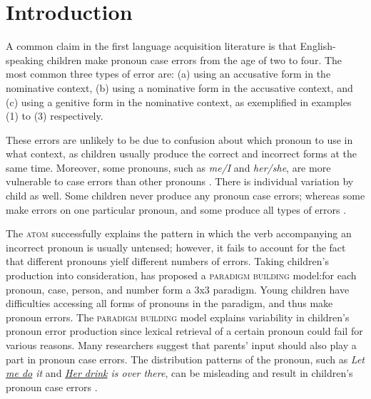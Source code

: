 \section{Introduction}
A common claim in the first language acquisition literature is that English-speaking children make pronoun case errors from the age of two to four. The most common three types of error are: (a) using an accusative form in the nominative context, (b) using a nominative form in the accusative context, and (c) using a genitive form in the nominative context, as exemplified in examples (1) to (3) respectively. 

\begin{exe}
\end{exe}

These errors are unlikely to be due to confusion about which pronoun to use in what context, as children usually produce the correct and incorrect forms at the same time. Moreover, some pronouns, such as \textit{me/I} and \textit{her/she}, are more vulnerable to case errors than other pronouns \citep[e.g.][]{schutze1996subject,rispoli1998,rispoli1999,pine2005testing}. There is individual variation by child as well. Some children never produce any pronoun case errors; whereas some make errors on one particular pronoun, and some produce all types of errors \citep{rispoli2005}.  




The \textsc{atom} successfully explains the pattern in which the verb accompanying an incorrect pronoun is usually untensed; however, it fails to account for the fact that different pronouns yielf different numbers of errors. Taking children's production into consideration,  \cite{rispoli1998,rispoli1999,rispoli2005} has proposed a  \textsc{paradigm building} model:for each pronoun, case, person, and number form a 3x3 paradigm. Young children have difficulties accessing all forms of pronouns in the paradigm, and thus make pronoun errors. The \textsc{paradigm building} model explains variability in children's pronoun error production since lexical retrieval of a certain pronoun could fail for various reasons. Many researchers suggest that parents' input should also play a part in pronoun case errors. The distribution patterns of the pronoun, such as \textit{Let \underline{me do} it} and \textit{\underline{Her drink} is over there}, can be misleading and result in children's pronoun case errors \citep[e.g.][]{budwig1996influences,tomasello2000,tomasello2003, ambridge2006testing,kirjavainen2009can}.


